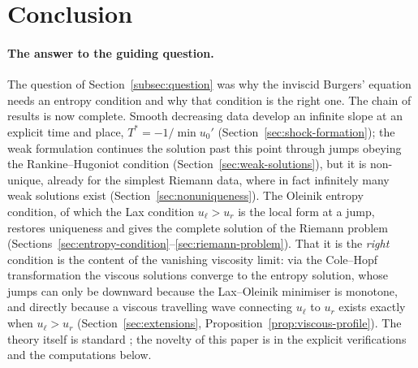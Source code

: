 \section{Conclusion}
\label{sec:conclusion}

\paragraph{The answer to the guiding question.}
The question of Section~\ref{subsec:question} was why the inviscid Burgers'
equation needs an entropy condition and why that condition is the right one.
The chain of results is now complete. Smooth decreasing data develop an
infinite slope at an explicit time and place,
$T^*=-1/\min u_0'$ (Section~\ref{sec:shock-formation}); the weak formulation
continues the solution past this point through jumps obeying the
Rankine--Hugoniot condition (Section~\ref{sec:weak-solutions}), but it is
non-unique, already for the simplest Riemann data, where in fact infinitely
many weak solutions exist (Section~\ref{sec:nonuniqueness}). The Oleinik
entropy condition, of which the Lax condition $u_\ell>u_r$ is the local form
at a jump, restores uniqueness and gives the complete solution of the Riemann
problem (Sections~\ref{sec:entropy-condition}--\ref{sec:riemann-problem}).
That it is the \emph{right} condition is the content of the vanishing
viscosity limit: via the Cole--Hopf transformation the viscous solutions
converge to the entropy solution, whose jumps can only be downward because
the Lax--Oleinik minimiser is monotone, and directly because a viscous
travelling wave connecting $u_\ell$ to $u_r$ exists exactly when
$u_\ell>u_r$ (Section~\ref{sec:extensions}, Proposition~\ref{prop:viscous-profile}). The
theory itself is standard \cite[\S3.4]{evans2010}; the novelty of this
paper is in the explicit verifications and the computations below.

